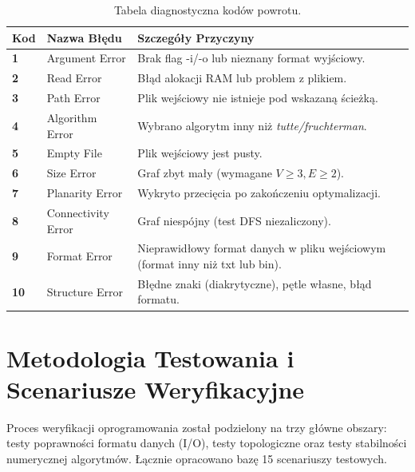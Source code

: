 \documentclass[12pt,a4paper]{article}
\begin{document}
\begin{table}[h]
    \centering
    \small
    \begin{tabularx}{\textwidth}{@{} l l X @{}}
        \toprule
        \textbf{Kod} & \textbf{Nazwa Błędu} & \textbf{Szczegóły Przyczyny} \\
        \midrule
        \textbf{1} & Argument Error & Brak flag -i/-o lub nieznany format wyjściowy. \\
        \textbf{2} & Read Error & Błąd alokacji RAM lub problem z plikiem. \\
        \textbf{3} & Path Error & Plik wejściowy nie istnieje pod wskazaną ścieżką. \\
        \textbf{4} & Algorithm Error & Wybrano algorytm inny niż \textit{tutte/fruchterman}. \\
        \textbf{5} & Empty File & Plik wejściowy jest pusty. \\
        \textbf{6} & Size Error & Graf zbyt mały (wymagane $V \ge 3, E \ge 2$). \\
        \textbf{7} & Planarity Error & Wykryto przecięcia po zakończeniu optymalizacji. \\
        \textbf{8} & Connectivity Error & Graf niespójny (test DFS niezaliczony). \\
        \textbf{9} & Format Error & Nieprawidłowy format danych w pliku wejściowym (format inny
        niż txt lub bin). \\
        \textbf{10} & Structure Error & Błędne znaki (diakrytyczne), pętle własne, błąd formatu. \\
        \bottomrule
    \end{tabularx}
    \caption{Tabela diagnostyczna kodów powrotu.}
\end{table}

\section{Metodologia Testowania i Scenariusze Weryfikacyjne}

Proces weryfikacji oprogramowania został podzielony na trzy główne obszary: testy poprawności formatu danych (I/O), testy topologiczne oraz testy stabilności numerycznej algorytmów. Łącznie opracowano bazę 15 scenariuszy testowych.
\end{document}
